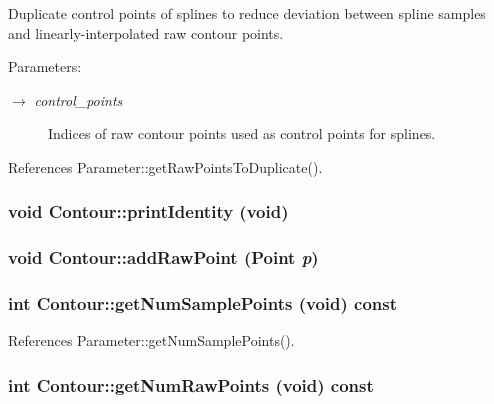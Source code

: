 Duplicate control points of splines to reduce deviation between spline samples and linearly-interpolated raw contour points. \begin{Desc}
\item[Parameters:]
\begin{description}
\item[\mbox{$\rightarrow$} {\em control\_\-points}]Indices of raw contour points used as control points for splines. \end{description}
\end{Desc}


References Parameter::getRawPointsToDuplicate().\hypertarget{classContour_4a50a35bbbcda623b7526ca38d81494c}{
\subsubsection[printIdentity]{\setlength{\rightskip}{0pt plus 5cm}void Contour::printIdentity (void)}}
\label{classContour_4a50a35bbbcda623b7526ca38d81494c}


\hypertarget{classContour_3feef63e061288c10d3d19788d44a2bc}{
\subsubsection[addRawPoint]{\setlength{\rightskip}{0pt plus 5cm}void Contour::addRawPoint ({\bf Point} {\em p})}}
\label{classContour_3feef63e061288c10d3d19788d44a2bc}


\hypertarget{classContour_7dca95e330dc1baf98ff5bc64279a0b4}{
\subsubsection[getNumSamplePoints]{\setlength{\rightskip}{0pt plus 5cm}int Contour::getNumSamplePoints (void) const}}
\label{classContour_7dca95e330dc1baf98ff5bc64279a0b4}




References Parameter::getNumSamplePoints().\hypertarget{classContour_28922b2cf76490fd14ea7019aedd1235}{
\subsubsection[getNumRawPoints]{\setlength{\rightskip}{0pt plus 5cm}int Contour::getNumRawPoints (void) const}}
\label{classContour_28922b2cf76490fd14ea7019aedd1235}





